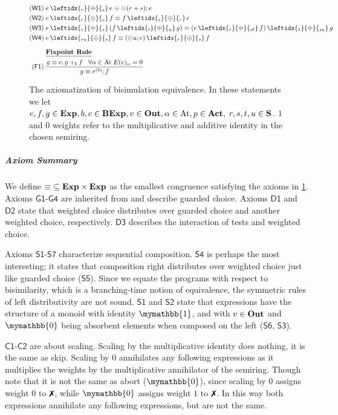 \documentclass[a4paper,UKenglish,cleveref, autoref, thm-restate]{lipics-v2021}
\newcommand{\xmark}{\text{\ding{55}}}
\newcommand{\Out}{\textbf{\upshape{Out}}}
\newcommand{\Act}{\textbf{\upshape{Act}}}
\newcommand{\At}{\text{\upshape{At}}}
\newcommand{\Exp}{\textbf{\upshape{Exp}}}
\newcommand{\BExp}{\textbf{\upshape{BExp}}}
\newcommand{\WC}[2]{\,\leftidx{_{#1}}{{\oplus}}{_{#2}}\,}
\newcommand{\Ax}[1]{\ensuremath{\mathsf{#1}}}
\newcommand{\bskip}{\mymathbb{1}}
\newcommand{\babort}{\mymathbb{0}}
\newcommand{\wgkat}{\textsf{\upshape{wGKAT}}\xspace}
\newcommand{\gkat}{\textsf{\upshape{GKAT}}\xspace}
\theoremstyle{plain}\newtheoremrep{thm}{Theorem}[section]
\begin{document}
\begin{figure}[t!]
\begin{equation*}
\begin{aligned}[t]
				\Ax{(W1)}\; &  e \WC{r}{s} e \equiv \odot (r+s);e \\
				\Ax{(W2)}\; &  e \WC{r}{s} f \equiv f \WC{s}{r} e \\
				\Ax{(W3)}\; &  e \WC{r}{s} (f \WC{t}{u} g ) \equiv (e \WC{r}{st} f) \WC{1}{su} g  \\ 
				\Ax{(W4)}\; &  e \WC{ru}{s} f \equiv (\odot u;e) \WC{r}{s} f \\[1.5ex]
				&\textbf{\underline{Fixpoint Rule} }   \\
				\Ax{(F1)}\; & \frac{ g\equiv e;g +_b f \;\;\; \forall \alpha\in\At\; E(e)_\alpha = 0}{g \equiv e^{(b)}; f}
			\end{aligned}
		\end{equation*}\vspace{-.45cm}
		\caption{The axiomatization of \wgkat bisimulation equivalence. In these statements we let $e,f,g \in \Exp, b,c \in \BExp, v\in\Out, \alpha \in \At, p \in \Act,\;  r,s,t,u \in \textbf{S}$. $1$ and $0$ weights refer to the multiplicative and additive identity in the chosen semiring.}
		\label{axiomsFig}
	\end{figure}
	\subparagraph*{Axiom Summary}
	
	We define ${\equiv} \subseteq {\Exp \times \Exp}$ as the smallest congruence satisfying the  axioms in \cref{axiomsFig}. Axioms \Ax{G1}-\Ax{G4} are inherited from \gkat \cite{Smolka_2019} and describe guarded choice. Axioms \Ax{D1} and \Ax{D2} state that weighted choice distributes over guarded choice and another weighted choice, respectively. \Ax{D3} describes the interaction of tests and weighted choice.
	
	
	Axioms \Ax{S1}-\Ax{S7} characterize sequential composition. \Ax{S4} is perhaps the most interesting; it states that composition right distributes over weighted choice just like guarded choice (\Ax{S5}). Since we equate the programs with respect to bisimilarity, which is a branching-time notion  of equivalence, the symmetric rules of left distributivity are not sound. \Ax{S1} and \Ax{S2} state that \wgkat expressions have the structure of a monoid with identity $\bskip$, and with $v \in \Out$ and $\babort$ being absorbent elements when composed on the left (\Ax{S6}, \Ax{S3}).
	
	\Ax{C1}-\Ax{C2} are about scaling. Scaling by the multiplicative identity does nothing, it is the same as skip. Scaling by $0$ annihilates any following expressions as it multiplies the weights by the multiplicative annihilator of the semiring. Though note that it is not the same as abort ($\babort$), since scaling by $0$ assigns weight $0$ to $\xmark$, while $\babort$ assigns weight $1$ to $\xmark$. In this way both expressions annihilate any following expressions, but are not the same.
	
\end{document}
